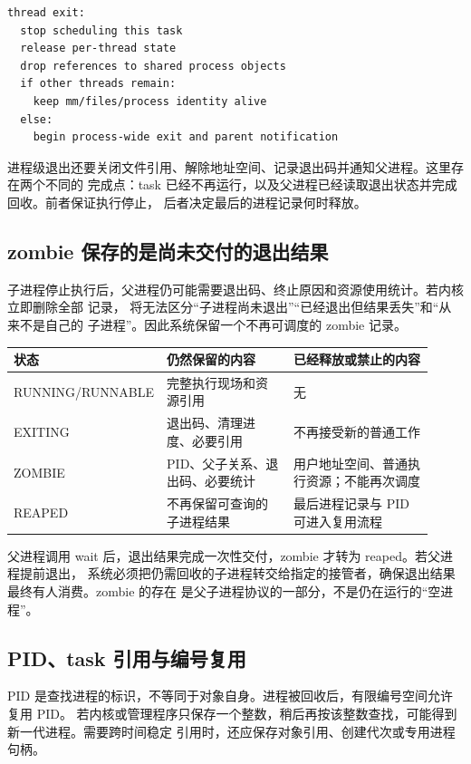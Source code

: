 \begin{lstlisting}
thread exit:
  stop scheduling this task
  release per-thread state
  drop references to shared process objects
  if other threads remain:
    keep mm/files/process identity alive
  else:
    begin process-wide exit and parent notification
\end{lstlisting}

进程级退出还要关闭文件引用、解除地址空间、记录退出码并通知父进程。这里存在两个不同的
完成点：task 已经不再运行，以及父进程已经读取退出状态并完成回收。前者保证执行停止，
后者决定最后的进程记录何时释放。

\subsection{zombie 保存的是尚未交付的退出结果}

子进程停止执行后，父进程仍可能需要退出码、终止原因和资源使用统计。若内核立即删除全部
记录， 将无法区分“子进程尚未退出”“已经退出但结果丢失”和“从来不是自己的
子进程”。因此系统保留一个不再可调度的 zombie 记录。

\begin{longtable}{|L{0.22\linewidth}|L{0.33\linewidth}|L{0.37\linewidth}|}
\toprule
状态 & 仍然保留的内容 & 已经释放或禁止的内容 \\
\midrule
RUNNING/RUNNABLE & 完整执行现场和资源引用 & 无 \\\tablerowrule
EXITING & 退出码、清理进度、必要引用 & 不再接受新的普通工作 \\\tablerowrule
ZOMBIE & PID、父子关系、退出码、必要统计 & 用户地址空间、普通执行资源；不能再次调度 \\\tablerowrule
REAPED & 不再保留可查询的子进程结果 & 最后进程记录与 PID 可进入复用流程 \\
\bottomrule
\end{longtable}

父进程调用 wait 后，退出结果完成一次性交付，zombie 才转为 reaped。若父进程提前退出，
系统必须把仍需回收的子进程转交给指定的接管者，确保退出结果最终有人消费。zombie 的存在
是父子进程协议的一部分，不是仍在运行的“空进程”。

\subsection{PID、task 引用与编号复用}

PID 是查找进程的标识，不等同于对象自身。进程被回收后，有限编号空间允许复用 PID。
若内核或管理程序只保存一个整数，稍后再按该整数查找，可能得到新一代进程。需要跨时间稳定
引用时，还应保存对象引用、创建代次或专用进程句柄。

